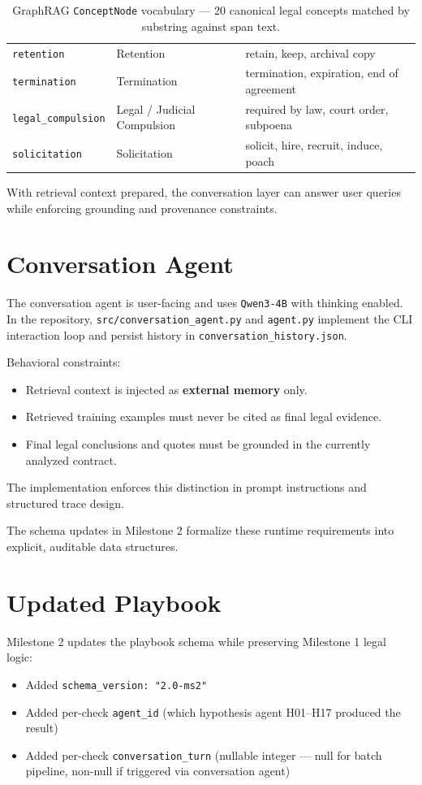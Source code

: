 \documentclass[11pt]{article}
\begin{document}
\begin{table}[h]
\begin{tabular}{lll}
\texttt{retention}              & Retention                  & retain, keep, archival copy \\
\texttt{termination}            & Termination                & termination, expiration, end of agreement \\
\texttt{legal\_compulsion}      & Legal / Judicial Compulsion & required by law, court order, subpoena \\
\texttt{solicitation}           & Solicitation               & solicit, hire, recruit, induce, poach \\
\hline
\end{tabular}
\caption{GraphRAG \texttt{ConceptNode} vocabulary — 20 canonical legal concepts matched by substring against span text.}
\label{tab:conceptnodes}
\end{table}

With retrieval context prepared, the conversation layer can answer user queries while enforcing grounding and provenance constraints.

\section{Conversation Agent}
The conversation agent is user-facing and uses \texttt{Qwen3-4B} with thinking enabled. In the repository, \texttt{src/conversation\_agent.py} and \texttt{agent.py} implement the CLI interaction loop and persist history in \texttt{conversation\_history.json}.

Behavioral constraints:
\begin{itemize}
  \item Retrieval context is injected as \textbf{external memory} only.
  \item Retrieved training examples must never be cited as final legal evidence.
  \item Final legal conclusions and quotes must be grounded in the currently analyzed contract.
\end{itemize}

The implementation enforces this distinction in prompt instructions and structured trace design.

The schema updates in Milestone 2 formalize these runtime requirements into explicit, auditable data structures.

\section{Updated Playbook}
Milestone 2 updates the playbook schema while preserving Milestone 1 legal logic:
\begin{itemize}
  \item Added \texttt{schema\_version: "2.0-ms2"}
  \item Added per-check \texttt{agent\_id} (which hypothesis agent H01--H17 produced the result)
  \item Added per-check \texttt{conversation\_turn} (nullable integer — null for batch pipeline, non-null if triggered via conversation agent)
\end{itemize}
\end{document}
